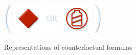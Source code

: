 \documentclass[a4paper,american,10pt]{paper}
\theoremstyle{definition}\newtheorem{definition}{Definition}
\begin{document}
\begin{figure}[H]
{{\includegraphics{BO_Thin}
\includegraphics{Atom}
\includegraphics{OR}
\includegraphics{Tank_Empty}
\includegraphics{BC_Thin}}
}
\caption{Representations of counterfactual formulas}
\label{fig:icon_formulas}
\end{figure}
\newpage%
\end{document}
